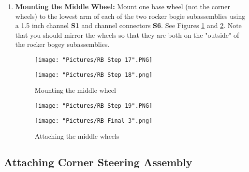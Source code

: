 \documentclass{article}
\begin{document}
\begin{enumerate}

\item \textbf{Mounting the Middle Wheel:} Mount one base wheel (not the corner wheels) to the lowest arm of each of the two rocker bogie subassemblies using a 1.5 inch channel \textbf{S1} and channel connectors \textbf{S6}. See Figures \ref{mounting the middle wheel} and \ref{final rocker bogie}.  Note that you should mirror the wheels so that they are both on the "outside" of the rocker bogey subassemblies.

\begin{figure}[H]
  \centering
  \begin{minipage}[b]{0.45\textwidth}
    \texttt{[image: "Pictures/RB Step 17".PNG]}
  \end{minipage}
  \hfill
  \begin{minipage}[b]{0.45\textwidth}
    \texttt{[image: "Pictures/RB Step 18".png]}
  \end{minipage}
  \caption{Mounting the middle wheel}
  \label{mounting the middle wheel}
\end{figure}

\begin{figure}[H]
  \centering
  \begin{minipage}[b]{0.45\textwidth}
    \texttt{[image: "Pictures/RB Step 19".PNG]}
  \end{minipage}
  \hfill
  \begin{minipage}[b]{0.45\textwidth}
    \texttt{[image: "Pictures/RB Final 3".png]}
  \end{minipage}
  \caption{Attaching the middle wheels}
  \label{final rocker bogie}
\end{figure}

\end{enumerate}

\subsection{Attaching Corner Steering Assembly}
\end{document}
